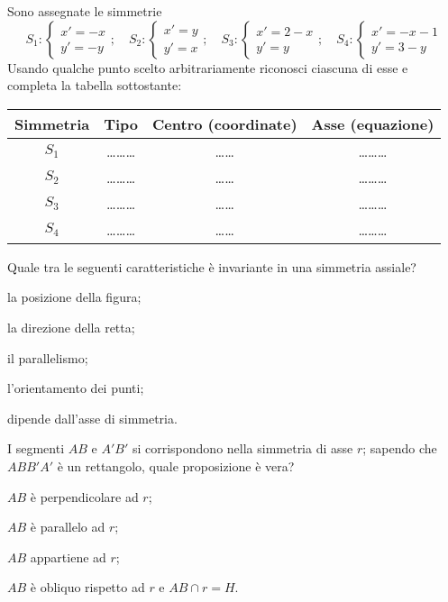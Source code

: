 \begin{esercizio}
\label{ese:8.39} %
Sono assegnate le simmetrie
\[S_1:\begin{cases}x'=-x\\y'=-y\end{cases};\quad 
S_2:\begin{cases}x'=y\\y'=x\end{cases};\quad
S_3:\begin{cases}x'=2-x\\y'=y\end{cases};\quad 
S_4:\begin{cases}x'=-x-1\\y'=3-y\end{cases}\]
Usando qualche punto scelto arbitrariamente riconosci ciascuna di 
esse e completa la tabella sottostante:
\begin{center}
\begin{tabular}{cccc}
\toprule
Simmetria & Tipo & Centro (coordinate) & Asse (equazione)\\
\midrule
$S_1$ & \ldots\ldots\ldots{} & \ldots\ldots{} & \ldots\ldots\ldots{} 
\\
$S_2$ & \ldots\ldots\ldots{} & \ldots\ldots{} & \ldots\ldots\ldots{} 
\\
$S_3$ & \ldots\ldots\ldots{} & \ldots\ldots{} & \ldots\ldots\ldots{} 
\\
$S_4$ & \ldots\ldots\ldots{} & \ldots\ldots{} & \ldots\ldots\ldots{} 
\\
\bottomrule
\end{tabular}
\end{center}
\end{esercizio}

\begin{esercizio}
\label{ese:8.40} %
Quale tra le seguenti caratteristiche è invariante in una simmetria 
assiale?
\begin{enumeratea}
\item la posizione della figura;
\item la direzione della retta;
\item il parallelismo;
\item l'orientamento dei punti;
\item dipende dall'asse di simmetria.
\end{enumeratea}
\end{esercizio}

\begin{esercizio}
\label{ese:8.41} %
I segmenti $AB$ e $A'B'$ si corrispondono nella simmetria di asse 
$r$; sapendo che $ABB'A'$ è un rettangolo, quale proposizione è vera?
\begin{enumeratea}
\item $AB$ è perpendicolare ad $r$;
\item $AB$ è parallelo ad $r$;
\item $AB$ appartiene ad $r$;
\item $AB$ è obliquo rispetto ad $r$ e $AB\cap r=H$.
\end{enumeratea}
\end{esercizio}

